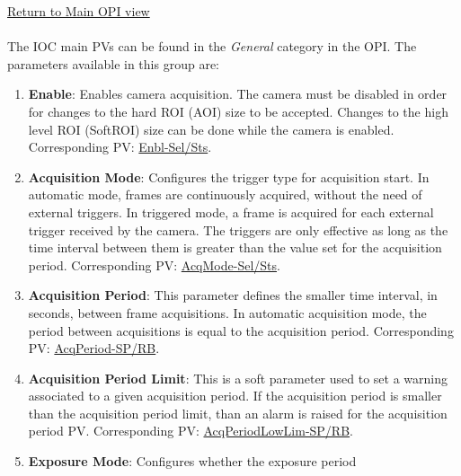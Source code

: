 \documentclass[openany]{article}
\begin{document}
        \hyperref[fig:opi-main]{Return to Main OPI view}

        \paragraph{} The IOC main PVs can be found in the \emph{General} category in                             the OPI. The parameters available in this group are: 

        \begin{enumerate}
                    \item \textbf{Enable}: Enables camera acquisition. The camera must be 
                        disabled in order for changes to the hard ROI (AOI) size to be 
                        accepted. Changes to the high level ROI (SoftROI) size can be done 
                        while the camera is enabled. Corresponding PV: 
                        \hyperlink{pv:enbl}{Enbl-Sel/Sts}.
            \item \textbf{Acquisition Mode}: Configures the trigger type for 
                        acquisition start. In automatic mode, frames are continuously 
                        acquired, without the need of external triggers. In triggered mode,
                        a frame is acquired for each external trigger received by the 
                        camera. The triggers are only effective as long as the time interval
                        between them is greater than the value set for the acquisition 
                        period. Corresponding PV: \hyperlink{pv:acq-mode}{AcqMode-Sel/Sts}.
            \item \textbf{Acquisition Period}: This parameter defines the smaller 
                        time interval, in seconds, between frame acquisitions. In automatic
                        acquisition mode, the period between acquisitions is equal to the
                        acquisition period. Corresponding PV: 
                        \hyperlink{pv:acq-period}{AcqPeriod-SP/RB}.
            \item \textbf{Acquisition Period Limit}: This is a soft parameter used 
                        to set a warning associated to a given acquisition period. If the 
                        acquisition period is smaller than the acquisition period limit, 
                        than an alarm is raised for the acquisition period PV. Corresponding
                        PV: \hyperlink{pv:acq-period-lim}{AcqPeriodLowLim-SP/RB}.
            \item \textbf{Exposure Mode}: Configures whether the exposure period 

\end{enumerate}
\end{document}
